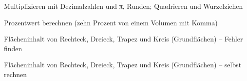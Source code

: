 \begin{aufgabe}{Multiplizieren mit Dezimalzahlen und π, Runden; Quadrieren und Wurzelziehen}
\end{aufgabe}

\begin{aufgabe}{Prozentwert berechnen (zehn Prozent von einem Volumen mit Komma)}
\end{aufgabe}

\begin{aufgabe}{Flächeninhalt von Rechteck, Dreieck, Trapez und Kreis (Grundflächen) – Fehler finden}
\end{aufgabe}

\begin{aufgabe}{Flächeninhalt von Rechteck, Dreieck, Trapez und Kreis (Grundflächen) – selbst rechnen}
\end{aufgabe}

